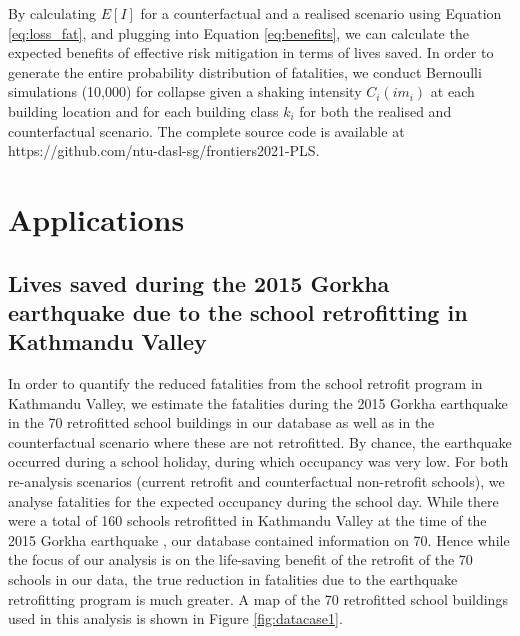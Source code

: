 \documentclass[utf8]{frontiersSCNS} %
\begin{document}
By calculating $E[I]$ for a counterfactual and a realised scenario using Equation \ref{eq:loss_fat}, and plugging into Equation \ref{eq:benefits}, we can calculate the expected benefits of effective risk mitigation in terms of lives saved. In order to generate the entire probability distribution of fatalities, we conduct Bernoulli simulations (10,000) for collapse given a shaking intensity $C_{i}(im_{i})$ at each building location and for each building class $k_{i}$ for both the realised and counterfactual scenario. The complete source code is available at https://github.com/ntu-dasl-sg/frontiers2021-PLS.

 
\section{Applications}
\label{section-apps}

\subsection{Lives saved during the 2015 Gorkha earthquake due to the school retrofitting in Kathmandu Valley}
\label{section-case1}

In order to quantify the reduced fatalities from the school retrofit program in Kathmandu Valley, we estimate the fatalities during the 2015 Gorkha earthquake in the 70 retrofitted school buildings in our database as well as in the counterfactual scenario where these are not retrofitted. By chance, the earthquake occurred during a school holiday, during which occupancy was very low. For both re-analysis scenarios (current retrofit and counterfactual non-retrofit schools), we analyse fatalities for the expected occupancy during the school day. While there were a total of 160 schools retrofitted in  Kathmandu Valley at the time of the 2015 Gorkha earthquake \citep{marasini_2019}, our database contained information on 70. Hence while the focus of our analysis is on the life-saving benefit of the retrofit of the 70 schools in our data, the true reduction in fatalities due to the earthquake retrofitting program is much greater. A map of the 70 retrofitted school buildings used in this analysis is shown in  Figure \ref{fig:datacase1}.
\end{document}
